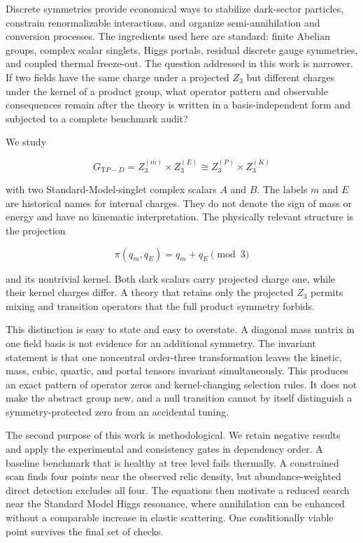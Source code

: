 \documentclass[
]{article}
\begin{document}
Discrete symmetries provide economical ways to stabilize dark-sector
particles, constrain renormalizable interactions, and organize
semi-annihilation and conversion processes. The ingredients used here
are standard: finite Abelian groups, complex scalar singlets, Higgs
portals, residual discrete gauge symmetries, and coupled thermal
freeze-out. The question addressed in this work is narrower. If two
fields have the same charge under a projected \(Z_3\) but different
charges under the kernel of a product group, what operator pattern and
observable consequences remain after the theory is written in a
basis-independent form and subjected to a complete benchmark audit?

We study

\[
G_{\mathrm TP-D}=Z_3^{(m)}\times Z_3^{(E)}
\cong Z_3^{(P)}\times Z_3^{(K)}
\]

with two Standard-Model-singlet complex scalars \(A\) and \(B\). The
labels \(m\) and \(E\) are historical names for internal charges. They
do not denote the sign of mass or energy and have no kinematic
interpretation. The physically relevant structure is the projection

\[
\pi(q_m,q_E)=q_m+q_E\pmod 3
\]

and its nontrivial kernel. Both dark scalars carry projected charge one,
while their kernel charges differ. A theory that retains only the
projected \(Z_3\) permits mixing and transition operators that the full
product symmetry forbids.

This distinction is easy to state and easy to overstate. A diagonal mass
matrix in one field basis is not evidence for an additional symmetry.
The invariant statement is that one noncentral order-three
transformation leaves the kinetic, mass, cubic, quartic, and portal
tensors invariant simultaneously. This produces an exact pattern of
operator zeros and kernel-changing selection rules. It does not make the
abstract group new, and a null transition cannot by itself distinguish a
symmetry-protected zero from an accidental tuning.

The second purpose of this work is methodological. We retain negative
results and apply the experimental and consistency gates in dependency
order. A baseline benchmark that is healthy at tree level fails
thermally. A constrained scan finds four points near the observed relic
density, but abundance-weighted direct detection excludes all four. The
equations then motivate a reduced search near the Standard Model Higgs
resonance, where annihilation can be enhanced without a comparable
increase in elastic scattering. One conditionally viable point survives
the final set of checks.
\end{document}
